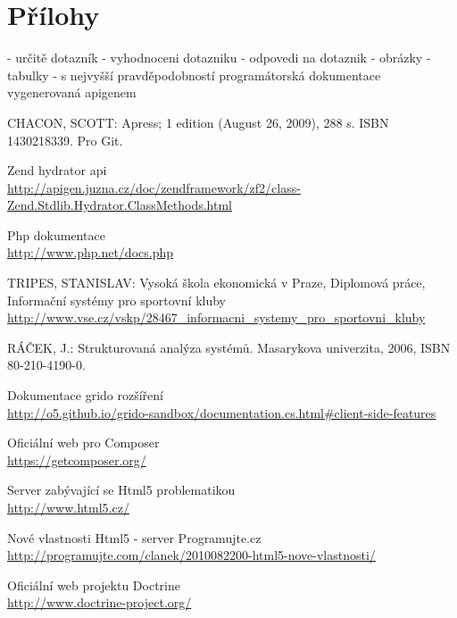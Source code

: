 \documentclass[11pt,oneside]{fithesis}
\begin{document}
\chapter{Přílohy}
- určitě dotazník
- vyhodnoceni dotazniku
- odpovedi na dotaznik
- obrázky
- tabulky
- s nejvyšší pravděpodobností programátorská dokumentace vygenerovaná apigenem


\begin{thebibliography}{99}

 CHACON, SCOTT: Apress; 1 edition (August 26, 2009), 288 s. ISBN 1430218339. Pro Git.

 Zend hydrator api\\
\url{http://apigen.juzna.cz/doc/zendframework/zf2/class-Zend.Stdlib.Hydrator.ClassMethods.html}

 Php dokumentace\\
\url{http://www.php.net/docs.php}

 TRIPES, STANISLAV: Vysoká škola ekonomická v Praze, Diplomová práce, Informační systémy pro sportovní kluby\\
\url{http://www.vse.cz/vskp/28467_informacni_systemy_pro_sportovni_kluby}

 RÁČEK, J.: Strukturovaná analýza systémů. Masarykova univerzita, 2006, ISBN\\
80-210-4190-0.

 Dokumentace grido rozšíření\\
\url{http://o5.github.io/grido-sandbox/documentation.cs.html#client-side-features}

 Oficiální web pro Composer\\
\url{https://getcomposer.org/}

 Server zabývající se Html5 problematikou\\
\url{http://www.html5.cz/}

 Nové vlastnosti Html5 - server Programujte.cz\\
\url{http://programujte.com/clanek/2010082200-html5-nove-vlastnosti/}

 Oficiální web projektu Doctrine\\
\url{http://www.doctrine-project.org/}


\end{thebibliography}
\end{document}
